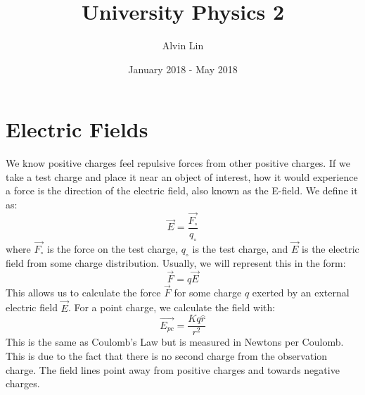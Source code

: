 \documentclass{math}
\title{University Physics 2}
\author{Alvin Lin}
\date{January 2018 - May 2018}
\begin{document}
\maketitle

\section*{Electric Fields}
We know positive charges feel repulsive forces from other positive charges. If
we take a test charge and place it near an object of interest, how it would
experience a force is the direction of the electric field, also known as the
E-field. We define it as:
\[ \vec{E} = \frac{\vec{F_{\circ}}}{q_{\circ}} \]
where \( \vec{F_{\circ}} \) is the force on the test charge, \( q_{\circ} \)
is the test charge, and \( \vec{E} \) is the electric field from some charge
distribution. Usually, we will represent this in the form:
\[ \vec{F} = q\vec{E} \]
This allows us to calculate the force \( \vec{F} \) for some charge \( q \)
exerted by an external electric field \( \vec{E} \). For a point charge, we
calculate the field with:
\[ \overrightarrow{E_{pc}} = \frac{Kq\hat{r}}{r^2} \]
This is the same as Coulomb's Law but is measured in Newtons per Coulomb. This
is due to the fact that there is no second charge from the observation charge.
The field lines point away from positive charges and towards negative charges.
\begin{center}
\end{center}
\end{document}
